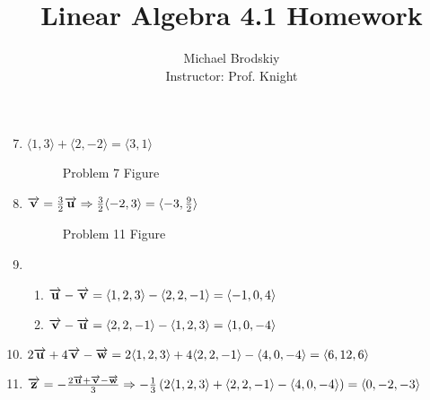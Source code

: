 \documentclass[12pt]{article}
\title{Linear Algebra 4.1 Homework}
\date{}
\author{Michael Brodskiy\\ \small Instructor: Prof. Knight}
\begin{document}
\maketitle

\begin{enumerate}

    \setcounter{enumi}{6}

  \item $\langle 1,3\rangle + \langle 2, -2 \rangle=\langle 3,1\rangle$

    \begin{figure}[h]
      \centering
      
      \caption{Problem 7 Figure}
      \label{fig:1}
    \end{figure}

    \setcounter{enumi}{10}

  \item $\overrightarrow{\bold{v}}=\frac{3}{2}\overrightarrow{\bold{u}}\Rightarrow \frac{3}{2}\langle -2, 3\rangle=\langle -3, \frac{9}{2}\rangle$

    \begin{figure}[h]
      \centering
      
      \caption{Problem 11 Figure}
      \label{fig:2}
    \end{figure}

    \setcounter{enumi}{18}

  \item

    \begin{enumerate}

      \item $\overrightarrow{\bold{u}}-\overrightarrow{\bold{v}}=\langle1,2,3\rangle - \langle 2,2,-1\rangle=\langle-1,0,4\rangle$

      \item $\overrightarrow{\bold{v}}-\overrightarrow{\bold{u}}=\langle 2,2,-1\rangle-\langle1,2,3\rangle=\langle1,0,-4\rangle$


    \end{enumerate}

    \setcounter{enumi}{20}

  \item $2\overrightarrow{\bold{u}}+4\overrightarrow{\bold{v}}-\overrightarrow{\bold{w}}=2\langle1,2,3\rangle+4\langle 2,2,-1\rangle-\langle4,0,-4\rangle=\langle6,12,6\rangle$

    \setcounter{enumi}{23}

  \item $\overrightarrow{\bold{z}}=-\frac{2\overrightarrow{\bold{u}}+\overrightarrow{\bold{v}}-\overrightarrow{\bold{w}}}{3}\Rightarrow -\frac{1}{3}\left( 2\langle1,2,3\rangle+\langle2,2,-1\rangle-\langle4,0,-4\rangle  \right)=\langle0,-2,-3\rangle$


\end{enumerate}
\end{document}
